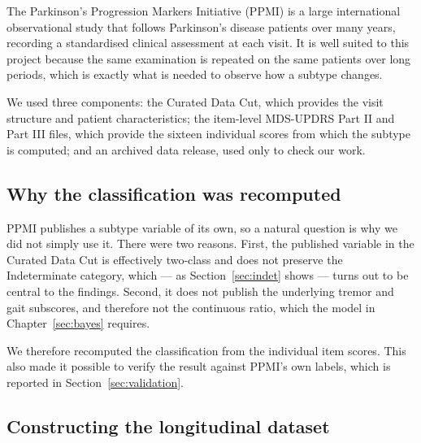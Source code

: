 \documentclass[11pt,a4paper]{article}
\begin{document}
The Parkinson's Progression Markers Initiative (PPMI) is a large international
observational study that follows Parkinson's disease patients over many years,
recording a standardised clinical assessment at each visit. It is well suited to
this project because the same examination is repeated on the same patients over
long periods, which is exactly what is needed to observe how a subtype changes.

We used three components: the Curated Data Cut, which provides the visit
structure and patient characteristics; the item-level MDS-UPDRS Part II and
Part III files, which provide the sixteen individual scores from which the
subtype is computed; and an archived data release, used only to check our work.

\subsection{Why the classification was recomputed}

PPMI publishes a subtype variable of its own, so a natural question is why we
did not simply use it. There were two reasons. First, the published variable in
the Curated Data Cut is effectively two-class and does not preserve the
Indeterminate category, which --- as Section~\ref{sec:indet} shows --- turns out
to be central to the findings. Second, it does not publish the underlying tremor
and gait subscores, and therefore not the continuous ratio, which the model in
Chapter~\ref{sec:bayes} requires.

We therefore recomputed the classification from the individual item scores. This
also made it possible to verify the result against PPMI's own labels, which is
reported in Section~\ref{sec:validation}.

\subsection{Constructing the longitudinal dataset}
\end{document}
